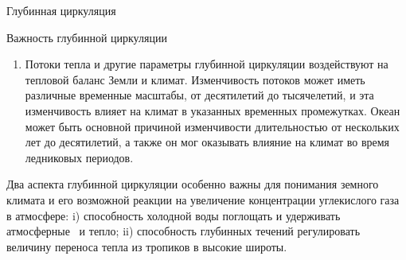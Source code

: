 \begin{chapter}{Глубинная циркуляция}
\begin{section}{Важность глубинной циркуляции}
\begin{enumerate}
\item 
Потоки тепла и другие параметры глубинной циркуляции воздействуют на тепловой
баланс Земли и климат. Изменчивость потоков может иметь различные временные
масштабы, от десятилетий до тысячелетий, и эта изменчивость влияет на климат
в указанных временных промежутках. Океан может быть основной причиной
изменчивости длительностью от нескольких лет до десятилетий, а также он
мог оказывать влияние на климат во время ледниковых периодов.
%
\end{enumerate}
Два аспекта глубинной циркуляции особенно важны для понимания земного климата
и его возможной реакции на увеличение концентрации углекислого 
газа~\COtwo{} в атмосфере: i) способность холодной воды поглощать
и удерживать атмосферные~\COtwo{} и тепло; ii) способность глубинных
течений регулировать величину переноса тепла 
из тропиков в высокие широты.
%


\end{section}
\end{chapter}

